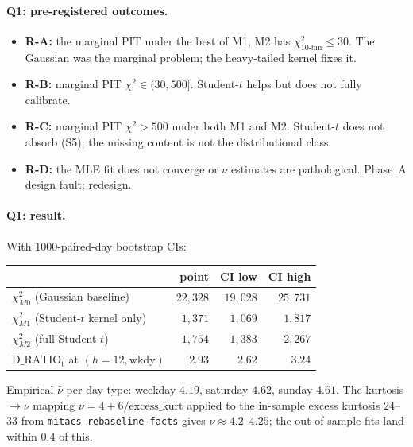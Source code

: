 \documentclass[11pt]{article}
\newcommand{\Studt}{\mathrm{t}}
\theoremstyle{definition}
\theoremstyle{plain}
\begin{document}
\paragraph{Q1: pre-registered outcomes.}
\begin{itemize}[leftmargin=2em]
\item \textbf{R-A:} the marginal PIT under the best of M1, M2 has
$\chi^{2}_{10\text{-bin}} \leq 30$. The Gaussian was the marginal
problem; the heavy-tailed kernel fixes it.
\item \textbf{R-B:} marginal PIT $\chi^{2} \in (30, 500]$.
Student-$t$ helps but does not fully calibrate.
\item \textbf{R-C:} marginal PIT $\chi^{2} > 500$ under both M1
and M2. Student-$t$ does not absorb (S5); the missing content
is not the distributional class.
\item \textbf{R-D:} the MLE fit does not converge or $\nu$
estimates are pathological. Phase~A design fault; redesign.
\end{itemize}

\paragraph{Q1: result.}
With $1000$-paired-day bootstrap CIs:

\begin{center}
\begin{tabular}{lrrr}
\toprule
& point & CI low & CI high \\
\midrule
$\chi^{2}_{M0}$ (Gaussian baseline)        & $22{,}328$ & $19{,}028$ & $25{,}731$ \\
$\chi^{2}_{M1}$ (Student-$t$ kernel only)  & $1{,}371$  & $1{,}069$  & $1{,}817$  \\
$\chi^{2}_{M2}$ (full Student-$t$)         & $1{,}754$  & $1{,}383$  & $2{,}267$  \\
$\mathrm{D\_RATIO}_{\Studt}$ at $(h{=}12, \mathrm{wkdy})$ & $2.93$ & $2.62$ & $3.24$ \\
\bottomrule
\end{tabular}
\end{center}

Empirical $\hat\nu$ per day-type: weekday $4.19$, saturday $4.62$,
sunday $4.61$. The kurtosis $\to \nu$ mapping
$\nu = 4 + 6/\mathrm{excess\_kurt}$ applied to the in-sample
excess kurtosis $24$--$33$ from \texttt{mitacs-rebaseline-facts}
gives $\nu \approx 4.2$--$4.25$; the out-of-sample fits land
within $0.4$ of this.
\end{document}
